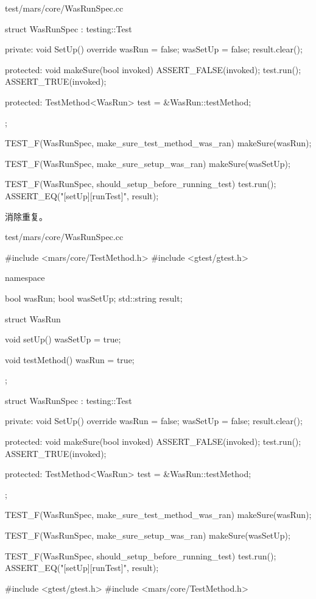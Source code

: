 \begin{content}
\begin{diff}{test/mars/core/WasRunSpec.cc}
\begin{minicpp}
{  struct WasRunSpec : testing::Test {
  private:
    void SetUp() override {
      wasRun = false;
      wasSetUp = false;
      result.clear();
    }

  protected:
    void makeSure(bool invoked) {
      ASSERT_FALSE(invoked);
      test.run();
      ASSERT_TRUE(invoked);      
    }

  protected:
    TestMethod<WasRun> test = &WasRun::testMethod;
  };
}

TEST_F(WasRunSpec, make_sure_test_method_was_ran) {
  makeSure(wasRun);
}

TEST_F(WasRunSpec, make_sure_setup_was_ran) {
  makeSure(wasSetUp);
}

TEST_F(WasRunSpec, should_setup_before_running_test) {
  test.run();
  ASSERT_EQ("[setUp][runTest]", result);
}
\end{minicpp}
\end{diff}

消除重复。

\begin{diff}{test/mars/core/WasRunSpec.cc}
\begin{minicpp}
#include <mars/core/TestMethod.h>
#include <gtest/gtest.h>

namespace {
  bool wasRun;
  bool wasSetUp;
  std::string result;

  struct WasRun {
    void setUp() {
      wasSetUp = true;
    }

    void testMethod() {
      wasRun = true;
    }
  };

  struct WasRunSpec : testing::Test {
  private:
    void SetUp() override {
      wasRun = false;
      wasSetUp = false;
      result.clear();
    }

  protected:
    void makeSure(bool invoked) {
      ASSERT_FALSE(invoked);
      test.run();
      ASSERT_TRUE(invoked);      
    }

  protected:
    TestMethod<WasRun> test = &WasRun::testMethod;
  };
}

TEST_F(WasRunSpec, make_sure_test_method_was_ran) {
  makeSure(wasRun);
}

TEST_F(WasRunSpec, make_sure_setup_was_ran) {
  makeSure(wasSetUp);
}

TEST_F(WasRunSpec, should_setup_before_running_test) {
  test.run();
  ASSERT_EQ("[setUp][runTest]", result);
}
\end{minicpp}
\tcblower
\begin{minicpp}
#include <gtest/gtest.h>
#include <mars/core/TestMethod.h>


\end{minicpp}
\end{diff}
\end{content}
